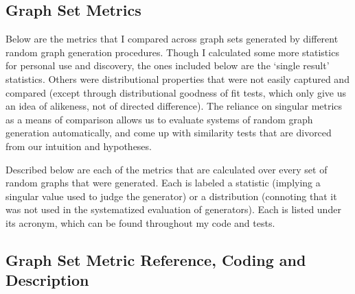 \subsection{Graph Set Metrics}
Below are the metrics that I compared across graph sets generated by different random graph generation procedures.
Though I calculated some more statistics for personal use and discovery, the ones included below are the `single result' statistics.
Others were distributional properties that were not easily captured and compared (except through distributional goodness of fit tests, which only give us an idea of alikeness, not of directed difference).
The reliance on singular metrics as a means of comparison allows us to evaluate systems of random graph generation automatically, and come up with similarity tests that are divorced from our intuition and hypotheses.

Described below are each of the metrics that are calculated over every set of random graphs that were generated.
Each is labeled a statistic (implying a singular value used to judge the generator) or a distribution (connoting that it was not used in the systematized evaluation of generators).
Each is listed under its acronym, which can be found throughout my code and tests. 

\subsection{Graph Set Metric Reference, Coding and Description}

